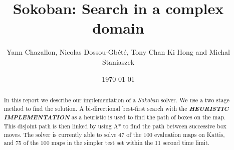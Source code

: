 \documentclass[a4paper,11pt]{article}
\title{Sokoban: Search in a complex domain}
\author{Yann Chazallon,  Nicolas Dossou-Gb{\'e}t{\'e}, Tony Chan Ki Hong and Michal Staniaszek}
\date{\today}
\begin{document}
\maketitle

\begin{abstract}
  In this report we describe our implementation of a \emph{Sokoban} solver. We
  use a two stage method to find the solution. A bi-directional best-first
  search with the \textbf{\emph{HEURISTIC IMPLEMENTATION}} as a heuristic is
  used to find the path of boxes on the map. This disjoint path is then linked
  by using A* to find the path between successive box moves. The solver is
  currently able to solve 47 of the 100 evaluation maps on Kattis, and 75 of the
  100 maps in the simpler test set within the 11 second time limit.
\end{abstract}

\begin{figure}[!ht]
  \captionsetup[subfigure]{labelformat=empty}
  \centering
  \quad
  \quad
  \quad
\end{figure}
\end{document}
